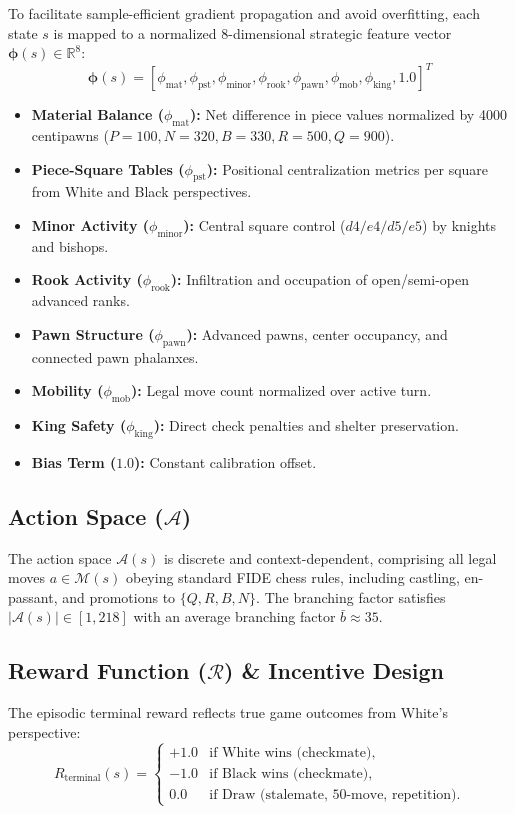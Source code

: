 \documentclass[conference,10pt,twocolumn]{IEEEtran}
\begin{document}
To facilitate sample-efficient gradient propagation and avoid overfitting, each state $s$ is mapped to a normalized 8-dimensional strategic feature vector $\boldsymbol{\phi}(s) \in \mathbb{R}^8$:
\begin{equation}
\boldsymbol{\phi}(s) = \left[ \phi_{\text{mat}}, \phi_{\text{pst}}, \phi_{\text{minor}}, \phi_{\text{rook}}, \phi_{\text{pawn}}, \phi_{\text{mob}}, \phi_{\text{king}}, 1.0 \right]^T
\end{equation}
\begin{itemize}
    \item \textbf{Material Balance ($\phi_{\text{mat}}$):} Net difference in piece values normalized by 4000 centipawns ($P=100, N=320, B=330, R=500, Q=900$).
    \item \textbf{Piece-Square Tables ($\phi_{\text{pst}}$):} Positional centralization metrics per square from White and Black perspectives.
    \item \textbf{Minor Activity ($\phi_{\text{minor}}$):} Central square control ($d4/e4/d5/e5$) by knights and bishops.
    \item \textbf{Rook Activity ($\phi_{\text{rook}}$):} Infiltration and occupation of open/semi-open advanced ranks.
    \item \textbf{Pawn Structure ($\phi_{\text{pawn}}$):} Advanced pawns, center occupancy, and connected pawn phalanxes.
    \item \textbf{Mobility ($\phi_{\text{mob}}$):} Legal move count normalized over active turn.
    \item \textbf{King Safety ($\phi_{\text{king}}$):} Direct check penalties and shelter preservation.
    \item \textbf{Bias Term ($1.0$):} Constant calibration offset.
\end{itemize}

\subsection{Action Space ($\mathcal{A}$)}
The action space $\mathcal{A}(s)$ is discrete and context-dependent, comprising all legal moves $a \in \mathcal{M}(s)$ obeying standard FIDE chess rules, including castling, en-passant, and promotions to $\{Q, R, B, N\}$. The branching factor satisfies $|\mathcal{A}(s)| \in [1, 218]$ with an average branching factor $\bar{b} \approx 35$.

\subsection{Reward Function ($\mathcal{R}$) \& Incentive Design}
The episodic terminal reward reflects true game outcomes from White's perspective:
\begin{equation}
R_{\text{terminal}}(s) = \begin{cases} 
+1.0 & \text{if White wins (checkmate)}, \\
-1.0 & \text{if Black wins (checkmate)}, \\
0.0 & \text{if Draw (stalemate, 50-move, repetition)}.
\end{cases}
\end{equation}
\end{document}
